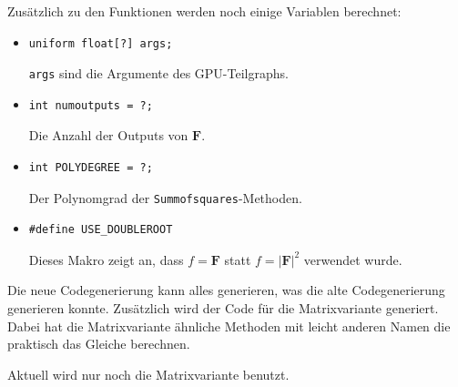 \documentclass[
	ngerman,%
	accentcolor=9c,%
	ruledheaders=section,%
	class=report,%
	thesis={type=bachelor},%
	fontsize=11pt,%
	parskip=half-,%
	custommargins=true,%
	marginpar=false,%
]{tudapub}
\begin{document}
Zusätzlich zu den Funktionen werden noch einige Variablen berechnet:

\begin{itemize}

\item
\begin{verbatim}
uniform float[?] args;
\end{verbatim}
\texttt{args} sind die Argumente des GPU-Teilgraphs.

\item
\begin{verbatim}
int numoutputs = ?;
\end{verbatim}
Die Anzahl der Outputs von \(\mathbf{F}\).

\item
\begin{verbatim}
int POLYDEGREE = ?;
\end{verbatim}
Der Polynomgrad der \texttt{Summofsquares}-Methoden.

\item
\begin{verbatim}
#define USE_DOUBLEROOT
\end{verbatim}
Dieses Makro zeigt an, dass \(f = \mathbf{F}\) statt \(f = |\mathbf{F}|^2\)
verwendet wurde.

\end{itemize}


Die neue Codegenerierung kann alles generieren, was die alte Codegenerierung generieren konnte. Zusätzlich wird der Code für die Matrixvariante generiert. Dabei hat die Matrixvariante ähnliche Methoden mit leicht anderen Namen die praktisch das Gleiche berechnen.

Aktuell wird nur noch die Matrixvariante benutzt.



\end{document}
